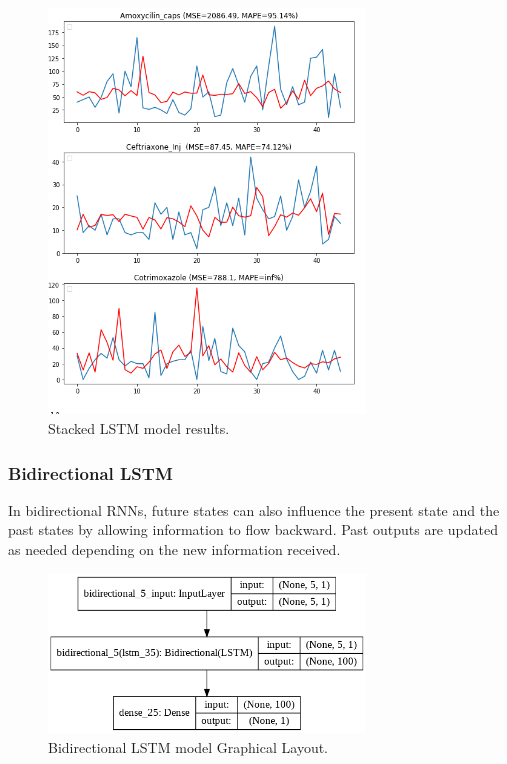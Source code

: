 \documentclass[12pt]{report}
\begin{document}
\begin{figure}[H]%
\begin {center}
\includegraphics[width=0.75\textwidth]{images/stacked (2).png}
\caption{Stacked LSTM model results.}
\label{fig:ecg}
\end {center}
\end{figure}

\subsubsection{Bidirectional LSTM}

In bidirectional RNNs, future states can also influence the present state and the past states by allowing information to flow backward. Past outputs are updated as needed depending on the new information received.

\begin{figure}[H]%
\begin {center}
\includegraphics[width=0.75\textwidth]{Bidirectional.png}
\caption{Bidirectional LSTM model Graphical Layout.}
\label{fig:ecg}
\end {center}
\end{figure}
\end{document}
